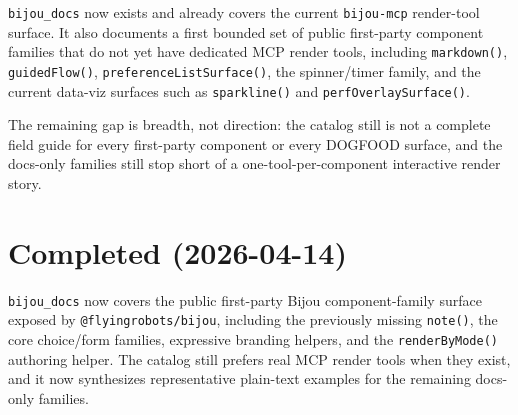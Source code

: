 \texttt{b\allowbreak{}i\allowbreak{}j\allowbreak{}o\allowbreak{}u\allowbreak{}\_\allowbreak{}d\allowbreak{}o\allowbreak{}c\allowbreak{}s} now exists and already covers the current \texttt{b\allowbreak{}i\allowbreak{}j\allowbreak{}o\allowbreak{}u\allowbreak{}-\allowbreak{}m\allowbreak{}c\allowbreak{}p} render-tool surface. It also documents a first bounded set of public first-party component families that do not yet have dedicated MCP render tools, including \texttt{m\allowbreak{}a\allowbreak{}r\allowbreak{}k\allowbreak{}d\allowbreak{}o\allowbreak{}w\allowbreak{}n\allowbreak{}(\allowbreak{})}, \texttt{g\allowbreak{}u\allowbreak{}i\allowbreak{}d\allowbreak{}e\allowbreak{}d\allowbreak{}F\allowbreak{}l\allowbreak{}o\allowbreak{}w\allowbreak{}(\allowbreak{})}, \texttt{p\allowbreak{}r\allowbreak{}e\allowbreak{}f\allowbreak{}e\allowbreak{}r\allowbreak{}e\allowbreak{}n\allowbreak{}c\allowbreak{}e\allowbreak{}L\allowbreak{}i\allowbreak{}s\allowbreak{}t\allowbreak{}S\allowbreak{}u\allowbreak{}r\allowbreak{}f\allowbreak{}a\allowbreak{}c\allowbreak{}e\allowbreak{}(\allowbreak{})}, the spinner/timer family, and the current data-viz surfaces such as \texttt{s\allowbreak{}p\allowbreak{}a\allowbreak{}r\allowbreak{}k\allowbreak{}l\allowbreak{}i\allowbreak{}n\allowbreak{}e\allowbreak{}(\allowbreak{})} and \texttt{p\allowbreak{}e\allowbreak{}r\allowbreak{}f\allowbreak{}O\allowbreak{}v\allowbreak{}e\allowbreak{}r\allowbreak{}l\allowbreak{}a\allowbreak{}y\allowbreak{}S\allowbreak{}u\allowbreak{}r\allowbreak{}f\allowbreak{}a\allowbreak{}c\allowbreak{}e\allowbreak{}(\allowbreak{})}.

The remaining gap is breadth, not direction: the catalog still is not a complete field guide for every first-party component or every DOGFOOD surface, and the docs-only families still stop short of a one-tool-per-component interactive render story.

\section{Completed (2026-04-14)}\label{record-294-completed-2026-04-14}

\texttt{b\allowbreak{}i\allowbreak{}j\allowbreak{}o\allowbreak{}u\allowbreak{}\_\allowbreak{}d\allowbreak{}o\allowbreak{}c\allowbreak{}s} now covers the public first-party Bijou component-family surface exposed by \texttt{@\allowbreak{}f\allowbreak{}l\allowbreak{}y\allowbreak{}i\allowbreak{}n\allowbreak{}g\allowbreak{}r\allowbreak{}o\allowbreak{}b\allowbreak{}o\allowbreak{}t\allowbreak{}s\allowbreak{}/\allowbreak{}b\allowbreak{}i\allowbreak{}j\allowbreak{}o\allowbreak{}u}, including the previously missing \texttt{n\allowbreak{}o\allowbreak{}t\allowbreak{}e\allowbreak{}(\allowbreak{})}, the core choice/form families, expressive branding helpers, and the \texttt{r\allowbreak{}e\allowbreak{}n\allowbreak{}d\allowbreak{}e\allowbreak{}r\allowbreak{}B\allowbreak{}y\allowbreak{}M\allowbreak{}o\allowbreak{}d\allowbreak{}e\allowbreak{}(\allowbreak{})} authoring helper. The catalog still prefers real MCP render tools when they exist, and it now synthesizes representative plain-text examples for the remaining docs-only families.

